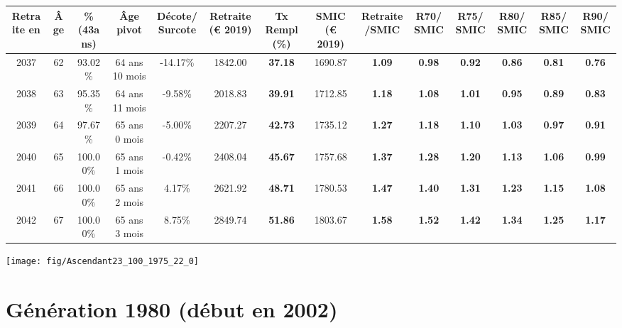 \begin{adjustbox}{max width=\textwidth} 
\begin{tabular}[htb]{|c|c||c|c|c||c|c||c|c||c|c|c|c|c|} 
\hline 
 Retraite en &  Âge &  \%(43ans) &  Âge pivot &  Décote/Surcote &  Retraite (\euro{} 2019) &  Tx Rempl(\%) &  SMIC (\euro{} 2019) &  Retraite/SMIC &  R70/SMIC &  R75/SMIC &  R80/SMIC &  R85/SMIC &  R90/SMIC \\ 
\hline \hline 
 2037 &  62 &  93.02\% &  64 ans 10 mois &  -14.17\% &  1842.00 &  {\bf 37.18} &  1690.87 &  {\bf 1.09} &  {\bf {\color{red} 0.98}} &  {\bf {\color{red} 0.92}} &  {\bf {\color{red} 0.86}} &  {\bf {\color{red} 0.81}} &  {\bf {\color{red} 0.76}} \\ 
\hline 
 2038 &  63 &  95.35\% &  64 ans 11 mois &  -9.58\% &  2018.83 &  {\bf 39.91} &  1712.85 &  {\bf 1.18} &  {\bf 1.08} &  {\bf 1.01} &  {\bf {\color{red} 0.95}} &  {\bf {\color{red} 0.89}} &  {\bf {\color{red} 0.83}} \\ 
\hline 
 2039 &  64 &  97.67\% &  65 ans 0 mois &  -5.00\% &  2207.27 &  {\bf 42.73} &  1735.12 &  {\bf 1.27} &  {\bf 1.18} &  {\bf 1.10} &  {\bf 1.03} &  {\bf {\color{red} 0.97}} &  {\bf {\color{red} 0.91}} \\ 
\hline 
 2040 &  65 &  100.00\% &  65 ans 1 mois &  -0.42\% &  2408.04 &  {\bf 45.67} &  1757.68 &  {\bf 1.37} &  {\bf 1.28} &  {\bf 1.20} &  {\bf 1.13} &  {\bf 1.06} &  {\bf {\color{red} 0.99}} \\ 
\hline 
 2041 &  66 &  100.00\% &  65 ans 2 mois &  4.17\% &  2621.92 &  {\bf 48.71} &  1780.53 &  {\bf 1.47} &  {\bf 1.40} &  {\bf 1.31} &  {\bf 1.23} &  {\bf 1.15} &  {\bf 1.08} \\ 
\hline 
 2042 &  67 &  100.00\% &  65 ans 3 mois &  8.75\% &  2849.74 &  {\bf 51.86} &  1803.67 &  {\bf 1.58} &  {\bf 1.52} &  {\bf 1.42} &  {\bf 1.34} &  {\bf 1.25} &  {\bf 1.17} \\ 
\hline 
\hline 
\end{tabular} 
\end{adjustbox} 
 
 \vspace{0.1cm} 

 {\hspace{-2.2cm}\texttt{[image: fig/Ascendant23\_100\_1975\_22\_0]}} 

\newpage 
 
\section{Génération 1980 (début en 2002)\label{Ascendant23_100_1980_22_0}} 
 
